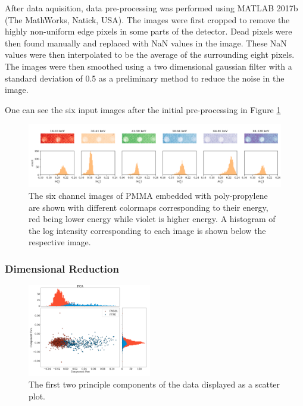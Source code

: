 \documentclass[a4paper,11pt]{article}
\begin{document}
After data aquisition, data pre-processing was performed using MATLAB 2017b (The MathWorks, Natick, USA). The images were first cropped to remove the highly non-uniform edge pixels in some parts of the detector. Dead pixels were then found manually and replaced with NaN values in the image. These NaN values were then interpolated to be the average of the surrounding eight pixels. The images were then smoothed using a two dimensional gaussian filter with a standard deviation of 0.5 as a preliminary method to reduce the noise in the image.

One can see the six input images after the initial pre-processing in Figure \ref{demonstrating_bins}

\begin{figure}[htbp]

\includegraphics[width=\textwidth]{figures/poly_figure2.png}

\caption{The six channel images of PMMA embedded with poly-propylene are shown with different colormaps corresponding to their energy, red being lower energy while violet is higher energy. A histogram of the log intensity corresponding to each image is shown below the respective image.}
\label{demonstrating_bins}
\end{figure}

\subsubsection{Dimensional Reduction}

\begin{figure}
  
  \begin{center}
    \includegraphics[width=0.48\textwidth]{figures/PCAnone.png}
  \end{center}
  
  \caption{The first two principle components of the data displayed as a scatter plot.}
  \label{PCA}
  
\end{figure}
\end{document}

